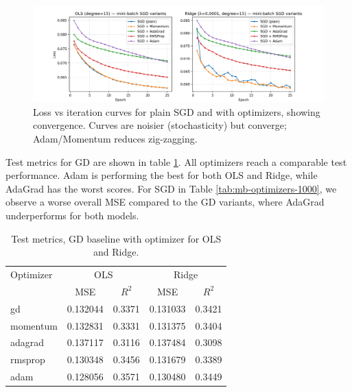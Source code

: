 \documentclass[amssymb,twocolumn,aps,floatfix]{revtex4-2}
\begin{document}
\begin{figure}[t]
    \centering
    \includegraphics[width=1\linewidth]{Project-1/Figures/Part_f_SGD_all_optimizers_loss_curves.png}
    \caption{Loss vs iteration curves for plain SGD and with optimizers, showing convergence. Curves are noisier (stochasticity) but converge; Adam/Momentum reduces zig-zagging.}
    \label{fig:loss_curves_sgd}
\end{figure}

Test metrics for GD are shown in table \ref{tab:test-metrics-optimizers}. All optimizers reach a comparable test performance. Adam is performing the best for both OLS and Ridge, while AdaGrad has the worst scores. For SGD in Table \ref{tab:mb-optimizers-1000}, we observe a worse overall MSE compared to the GD variants, where AdaGrad underperforms for both models. 

\begin{table}[h!]
\caption{Test metrics, GD baseline with optimizer for OLS and Ridge.}
\label{tab:test-metrics-optimizers}
\begin{ruledtabular}
\begin{tabular}{lcccc}
Optimizer & \multicolumn{2}{c}{OLS} & \multicolumn{2}{c}{Ridge} \\
\colrule
 & MSE & $R^2$ & MSE & $R^2$ \\
\colrule
gd       & 0.132044 & 0.3371 & 0.131033 & 0.3421 \\
momentum & 0.132831 & 0.3331 & 0.131375 & 0.3404 \\
adagrad  & 0.137117 & 0.3116 & 0.137484 & 0.3098 \\
rmsprop  & 0.130348 & 0.3456 & 0.131679 & 0.3389 \\
adam     & 0.128056 & 0.3571 & 0.130480 & 0.3449 \\
\end{tabular}
\end{ruledtabular}
\end{table}
\end{document}
